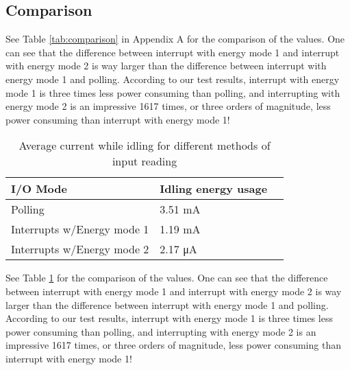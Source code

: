 \subsection{Comparison}

See Table \ref{tab:comparison} in Appendix A for the comparison of the values. One can see that the difference between interrupt with energy mode 1 and interrupt with energy mode 2 is way larger than the difference between interrupt with energy mode 1 and polling. According to our test results, interrupt with energy mode 1 is three times less power consuming than polling, and interrupting with energy mode 2 is an impressive 1617 times, or three orders of magnitude, less power consuming than interrupt with energy mode 1!

\begin{table}[ht!]
    \begin{center}
    \begin{tabular}{ | l | l | l | }
        \hline
        I/O Mode    & Idling energy usage \\
        \hline
        Polling & 3.51 mA \\
        \hline
        Interrupts w/Energy mode 1 & 1.19 mA \\
        \hline
        Interrupts w/Energy mode 2 & 2.17 \si{\micro\ampere} \\
        \hline
    \end{tabular}
    \caption{Average current while idling for different methods of input reading}
    \label{tab:energy_usage}
    \end{center}
\end{table}

See Table \ref{tab:energy_usage} for the comparison of the values.
One can see that the difference between interrupt with energy mode 1 and interrupt with energy mode 2 is way larger than the difference between interrupt with energy mode 1 and polling.
According to our test results, interrupt with energy mode 1 is three times less power consuming than polling, and interrupting with energy mode 2 is an impressive 1617 times, or three orders of magnitude, less power consuming than interrupt with energy mode 1!
